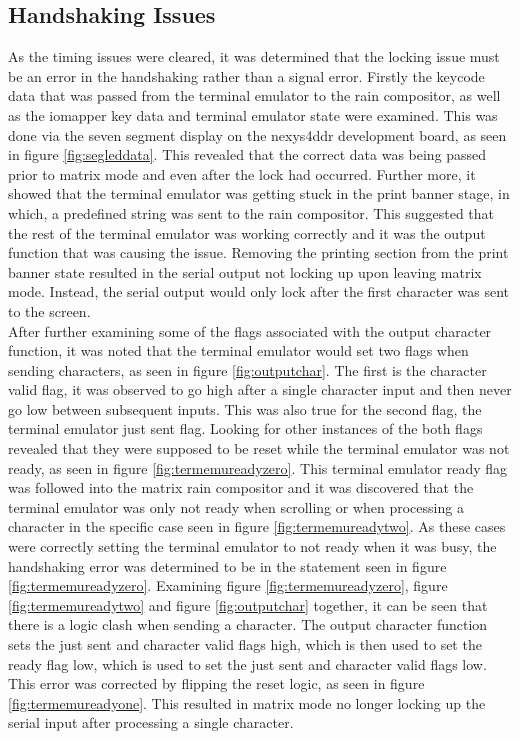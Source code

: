 \subsection{Handshaking Issues}

\label{Ch5 Sec1 Sub3}

As the timing issues were cleared, it was determined that the locking issue must be an error in the handshaking rather than a signal error. Firstly the keycode data that was passed from the terminal emulator to the rain compositor, as well as the iomapper key data and terminal emulator state were examined. This was done via the seven segment display on the nexys4ddr development board, as seen in figure \ref{fig:segleddata}. This revealed that the correct data was being passed prior to matrix mode and even after the lock had occurred. Further more, it showed that the terminal emulator was getting stuck in the print banner stage, in which, a predefined string was sent to the rain compositor. This suggested that the rest of the terminal emulator was working correctly and it was the output function that was causing the issue. Removing the printing section from the print banner state resulted in the serial output not locking up upon leaving matrix mode. Instead, the serial output would only lock after the first character was sent to the screen.\\

After further examining some of the flags associated with the output character function, it was noted that the terminal emulator would set two flags when sending characters, as seen in figure \ref{fig:outputchar}. The first is the character valid flag, it was observed to go high after a single character input and then never go low between subsequent inputs. This was also true for the second flag, the terminal emulator just sent flag. Looking for other instances of the both flags revealed that they were supposed to be reset while the terminal emulator was not ready, as seen in figure \ref{fig:termemureadyzero}. This terminal emulator ready flag was followed into the matrix rain compositor and it was discovered that the terminal emulator was only not ready when scrolling or when processing a character in the specific case seen in figure \ref{fig:termemureadytwo}. As these cases were correctly setting the terminal emulator to not ready when it was busy, the handshaking error was determined to be in the statement seen in figure \ref{fig:termemureadyzero}. Examining figure \ref{fig:termemureadyzero}, figure \ref{fig:termemureadytwo} and figure \ref{fig:outputchar} together, it can be seen that there is a logic clash when sending a character. The output character function sets the just sent and character valid flags high, which is then used to set the ready flag low, which is used to set the just sent and character valid flags low. This error was corrected by flipping the reset logic, as seen in figure \ref{fig:termemureadyone}. This resulted in matrix mode no longer locking up the serial input after processing a single character.

